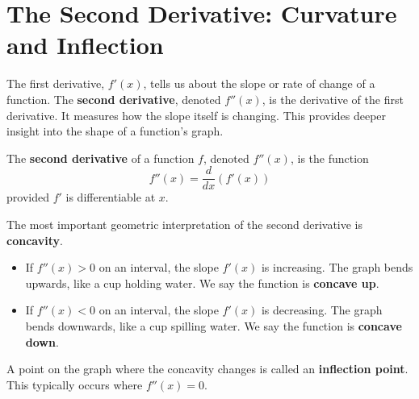     \section{The Second Derivative: Curvature and Inflection}

    The first derivative, \(f'(x)\), tells us about the slope or rate of change of a function. The \textbf{second derivative}, denoted \(f''(x)\), is the derivative of the first derivative. It measures how the slope itself is changing. This provides deeper insight into the shape of a function's graph.
    
    \begin{definition}
    The \textbf{second derivative} of a function \( f \), denoted \( f''(x) \), is the function
    \[
    f''(x) = \frac{d}{dx} \left( f'(x) \right)
    \]
    provided $f'$ is differentiable at $x$.
    \end{definition}
    
    The most important geometric interpretation of the second derivative is \textbf{concavity}.
    
    \begin{itemize}
        \item If \( f''(x) > 0 \) on an interval, the slope \(f'(x)\) is increasing. The graph bends upwards, like a cup holding water. We say the function is \textbf{concave up}.
        \item If \( f''(x) < 0 \) on an interval, the slope \(f'(x)\) is decreasing. The graph bends downwards, like a cup spilling water. We say the function is \textbf{concave down}.
    \end{itemize}
    
    A point on the graph where the concavity changes is called an \textbf{inflection point}. This typically occurs where \(f''(x) = 0\).
    
